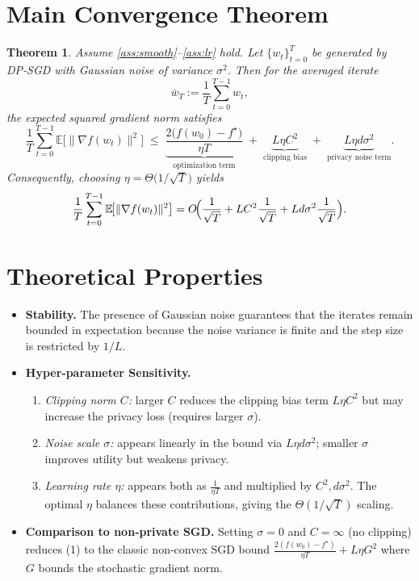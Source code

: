 \documentclass{article}
\newcommand{\E}{\mathbb{E}}
\newtheorem{theorem}{Theorem}
\begin{document}
\section*{Main Convergence Theorem}
\begin{theorem}\label{thm:main}
Assume \ref{ass:smooth}–\ref{ass:lr} hold. Let $\{w_t\}_{t=0}^{T}$ be generated by DP‑SGD with Gaussian noise of variance $\sigma^{2}$. Then for the averaged iterate
\[
\bar w_T:=\frac{1}{T}\sum_{t=0}^{T-1}w_t,
\]
the expected squared gradient norm satisfies
\[
\frac{1}{T}\sum_{t=0}^{T-1}\E\!\bigl[\|\nabla f(w_t)\|^{2}\bigr]
\;\le\;
\underbrace{\frac{2\bigl(f(w_0)-f^\star\bigr)}{\eta T}}_{\text{optimization term}}
\;+\;
\underbrace{L\eta C^{2}}_{\text{clipping bias}}
\;+\;
\underbrace{L\eta d\sigma^{2}}_{\text{privacy noise term}} .
\tag{1}
\]
Consequently, choosing $\eta=\Theta\bigl(1/\sqrt{T}\bigr)$ yields
\[
\frac{1}{T}\sum_{t=0}^{T-1}\E\!\bigl[\|\nabla f(w_t)\|^{2}\bigr]
=O\!\Bigl(\frac{1}{\sqrt{T}}+L C^{2}\frac{1}{\sqrt{T}}+L d\sigma^{2}\frac{1}{\sqrt{T}}\Bigr).
\]
\end{theorem}

\section*{Theoretical Properties}
\begin{itemize}
\item \textbf{Stability.} The presence of Gaussian noise guarantees that the iterates remain bounded in expectation because the noise variance is finite and the step size is restricted by $1/L$.
\item \textbf{Hyper‑parameter Sensitivity.}
    \begin{enumerate}[label=\alph*)]
    \item \emph{Clipping norm $C$:} larger $C$ reduces the clipping bias term $L\eta C^{2}$ but may increase the privacy loss (requires larger $\sigma$).
    \item \emph{Noise scale $\sigma$:} appears linearly in the bound via $L\eta d\sigma^{2}$; smaller $\sigma$ improves utility but weakens privacy.
    \item \emph{Learning rate $\eta$:} appears both as $\frac{1}{\eta T}$ and multiplied by $C^{2},d\sigma^{2}$. The optimal $\eta$ balances these contributions, giving the $\Theta(1/\sqrt{T})$ scaling.
    \end{enumerate}
\item \textbf{Comparison to non‑private SGD.} Setting $\sigma=0$ and $C=\infty$ (no clipping) reduces (1) to the classic non‑convex SGD bound $\frac{2(f(w_0)-f^\star)}{\eta T}+L\eta G^{2}$ where $G$ bounds the stochastic gradient norm.
\end{itemize}
\end{document}
